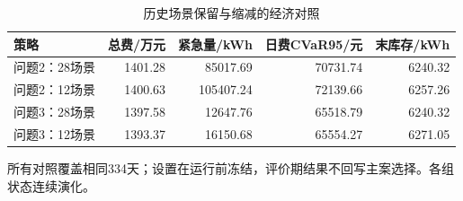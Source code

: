 \begin{table}[htbp]\centering\small
\caption{历史场景保留与缩减的经济对照}
\label{tab:v2_scenarios}
\begin{tabularx}{\linewidth}{LRRRR}\toprule
策略 & 总费/万元 & 紧急量/kWh & 日费CVaR95/元 & 末库存/kWh\\\midrule
问题2：28场景 & 1401.28 & 85017.69 & 70731.74 & 6240.32\\
问题2：12场景 & 1400.63 & 105407.24 & 72139.66 & 6257.26\\
问题3：28场景 & 1397.58 & 12647.76 & 65518.79 & 6240.32\\
问题3：12场景 & 1393.37 & 16150.68 & 65554.27 & 6271.05\\
\bottomrule\end{tabularx}
\par\smallskip\parbox{\linewidth}{\footnotesize 所有对照覆盖相同334天；设置在运行前冻结，评价期结果不回写主案选择。各组状态连续演化。}
\end{table}